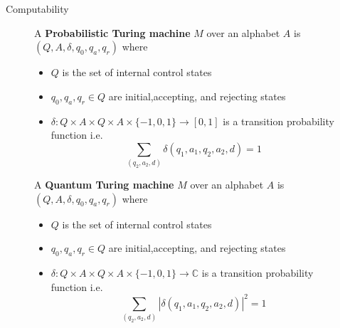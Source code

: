 \documentclass{beamer}
\begin{document}
\begin{frame}{Computability}

\begin{figure}[ht]
{\small
    \begin{minipage}{0.4\textwidth}
       A \textbf{Probabilistic Turing machine} $M$ over an alphabet $A$ is $\left(Q,A,\delta,q_0,q_a,q_r\right)$ where
       \begin{itemize}
         \item $Q$ is the set of internal control states
         \item $q_0,q_a,q_r\in Q$ are initial,accepting, and rejecting states
         \item $\delta:Q\times A\times Q\times A\times\{-1,0,1\}\to [0,1]$ is a transition probability function i.e.
           \[
             \sum_{\left(q_2,a_2,d\right)}\delta\left(q_1,a_1,q_2,a_2,d\right)=1
           \]
       \end{itemize}
    \end{minipage}
    \qquad
    \begin{minipage}{0.4\textwidth}
       A \textbf{Quantum Turing machine} $M$ over an alphabet $A$ is $\left(Q,A,\delta,q_0,q_a,q_r\right)$ where
       \begin{itemize}
         \item $Q$ is the set of internal control states
         \item $q_0,q_a,q_r\in Q$ are initial,accepting, and rejecting states
         \item $\delta:Q\times A\times Q\times A\times\{-1,0,1\}\to \mathbb{C}$ is a transition probability function i.e.
           \[
             \sum_{\left(q_2,a_2,d\right)}|\delta\left(q_1,a_1,q_2,a_2,d\right)|^2=1
           \]
       \end{itemize}
    \end{minipage}
}
\end{figure}

\end{frame}
\end{document}

